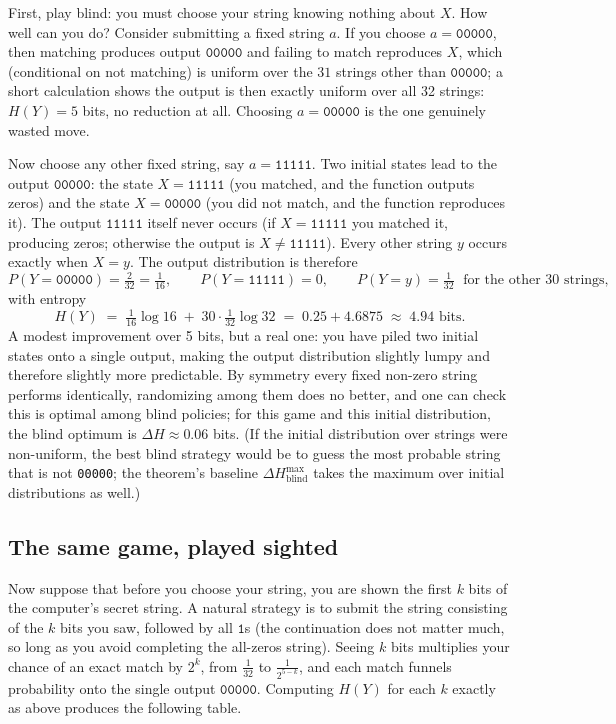\documentclass[10pt]{article}
\theoremstyle{definition}
\theoremstyle{remark}
\begin{document}
First, play blind: you must choose your string knowing nothing about $X$. How well can you do? Consider submitting a fixed string $a$. If you choose $a = \texttt{00000}$, then matching produces output $\texttt{00000}$ and failing to match reproduces $X$, which (conditional on not matching) is uniform over the $31$ strings other than $\texttt{00000}$; a short calculation shows the output is then exactly uniform over all 32 strings: $H(Y) = 5$ bits, no reduction at all. Choosing $a = \texttt{00000}$ is the one genuinely wasted move.

Now choose any other fixed string, say $a = \texttt{11111}$. Two initial states lead to the output $\texttt{00000}$: the state $X = \texttt{11111}$ (you matched, and the function outputs zeros) and the state $X = \texttt{00000}$ (you did not match, and the function reproduces it). The output $\texttt{11111}$ itself never occurs (if $X = \texttt{11111}$ you matched it, producing zeros; otherwise the output is $X \ne \texttt{11111}$). Every other string $y$ occurs exactly when $X = y$. The output distribution is therefore
\[
P(Y = \texttt{00000}) = \tfrac{2}{32} = \tfrac1{16}, \qquad
P(Y = \texttt{11111}) = 0, \qquad
P(Y = y) = \tfrac1{32} \;\text{ for the other 30 strings},
\]
with entropy
\[
H(Y) \;=\; \tfrac{1}{16}\log 16 \;+\; 30 \cdot \tfrac{1}{32} \log 32 \;=\; 0.25 + 4.6875 \;\approx\; 4.94 \text{ bits}.
\]
A modest improvement over 5 bits, but a real one: you have piled two initial states onto a single output, making the output distribution slightly lumpy and therefore slightly more predictable. By symmetry every fixed non-zero string performs identically, randomizing among them does no better, and one can check this is optimal among blind policies; for this game and this initial distribution, the blind optimum is $\Delta H \approx 0.06$ bits. (If the initial distribution over strings were non-uniform, the best blind strategy would be to guess the most probable string that is not \texttt{00000}; the theorem's baseline $\Delta H^{\max}_{\text{blind}}$ takes the maximum over initial distributions as well.)

\subsection{The same game, played sighted}
\label{sec:gamesighted}

Now suppose that before you choose your string, you are shown the first $k$ bits of the computer's secret string. A natural strategy is to submit the string consisting of the $k$ bits you saw, followed by all $\texttt{1}$s (the continuation does not matter much, so long as you avoid completing the all-zeros string). Seeing $k$ bits multiplies your chance of an exact match by $2^k$, from $\frac1{32}$ to $\frac{1}{2^{5-k}}$, and each match funnels probability onto the single output $\texttt{00000}$. Computing $H(Y)$ for each $k$ exactly as above produces the following table.
\end{document}
